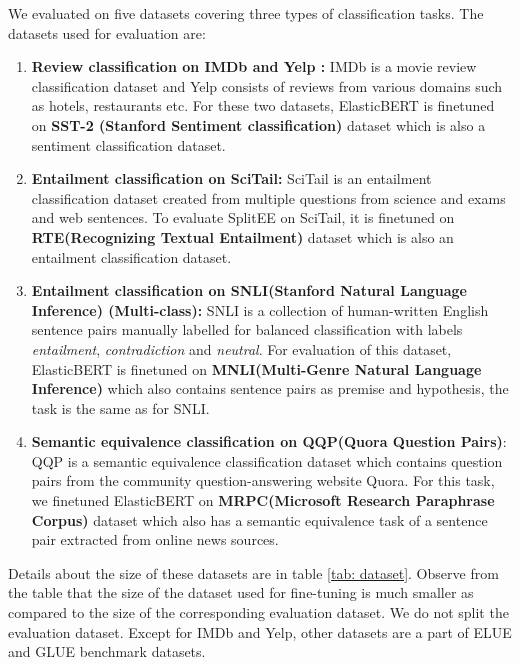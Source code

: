 We evaluated \our{} on five datasets covering three types of classification tasks. The datasets used for evaluation are:
\begin{enumerate}
    \item \textbf{Review classification on IMDb \cite{maas2011learning} and Yelp \cite{asghar2016yelp}:} IMDb is a movie review classification dataset and Yelp consists of reviews from various domains such as hotels, restaurants etc. For these two datasets, ElasticBERT is finetuned on \textbf{SST-2 (Stanford Sentiment classification)} dataset which is also a sentiment classification dataset.
    \item \textbf{Entailment classification on SciTail:} SciTail is an entailment classification dataset created from multiple questions from science and exams and web sentences. To evaluate SplitEE on SciTail, it is finetuned on \textbf{RTE(Recognizing Textual Entailment)} dataset which is also an entailment classification dataset.
    \item \textbf{Entailment classification on SNLI(Stanford Natural Language Inference) (Multi-class):} SNLI is a collection of human-written English sentence pairs manually labelled for balanced classification with labels \textit{entailment}, \textit{contradiction} and \textit{neutral}. For evaluation of this dataset, ElasticBERT is finetuned on \textbf{MNLI(Multi-Genre Natural Language Inference)} which also contains sentence pairs as premise and hypothesis, the task is the same as for SNLI.

    \item \textbf{Semantic equivalence classification on QQP(Quora Question Pairs)}: QQP is a semantic equivalence classification dataset which contains question pairs from the community question-answering website Quora. For this task, we finetuned ElasticBERT on \textbf{MRPC(Microsoft Research Paraphrase Corpus)} dataset which also has a semantic equivalence task of a sentence pair extracted from online news sources.
\end{enumerate}
  Details about the size of these datasets are in table \ref{tab: dataset}. Observe from the table that the size of the dataset used for fine-tuning is much smaller as compared to the size of the corresponding evaluation dataset. We do not split the evaluation dataset. Except for IMDb and Yelp, other datasets are a part of ELUE \cite{liu2021elasticbert} and GLUE \cite{wang2019glue} benchmark datasets.




